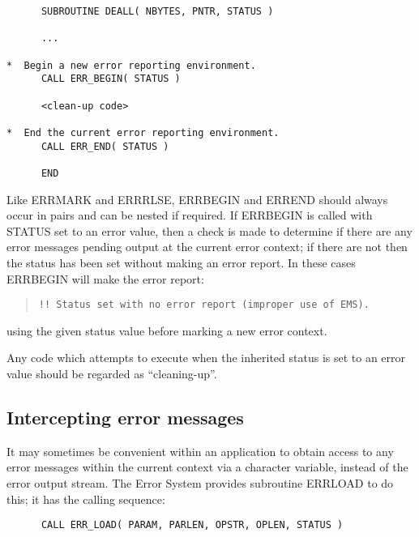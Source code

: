 \documentclass[twoside,11pt]{article}
\newcommand{\xlabel}[1]{}
\renewcommand{\_}{\texttt{\symbol{95}}}
\begin{document}
\begin {small}
\begin{verbatim}
      SUBROUTINE DEALL( NBYTES, PNTR, STATUS )

      ...

*  Begin a new error reporting environment.
      CALL ERR_BEGIN( STATUS )

      <clean-up code>

*  End the current error reporting environment.
      CALL ERR_END( STATUS )

      END
\end{verbatim}
\end {small}

Like ERR\_MARK and ERR\_RLSE, ERR\_BEGIN and ERR\_END should always occur in
pairs and can be nested if required.
If ERR\_BEGIN is called with STATUS set to an error value, then a check is 
made to determine if there are any error messages pending output at the 
current error context; if there are not then the status has been set without 
making an error report.
In these cases ERR\_BEGIN will make the error report:

\begin {quote}
\begin {small}
\begin{verbatim}
!! Status set with no error report (improper use of EMS).
\end{verbatim}
\end {small}
\end{quote}

using the given status value before marking a new error context.

Any code which attempts to execute when the inherited status is set to an error
value should be regarded as ``cleaning-up''.

\subsection{\xlabel{intercepting_error_messages}Intercepting error messages \label{intcpt_sect}}
It may sometimes be convenient within an application to obtain access to any 
error messages within the current context via a character variable,
instead of the error output stream.
The Error System provides subroutine ERR\_LOAD to do this; it has the
calling sequence:

\begin {small}
\begin{verbatim}
      CALL ERR_LOAD( PARAM, PARLEN, OPSTR, OPLEN, STATUS )
\end{verbatim}
\end {small}
\end{document}

